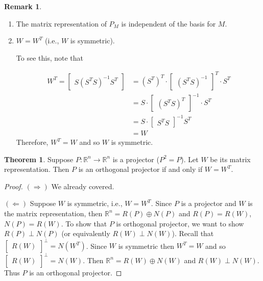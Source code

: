 \documentclass[12pt]{article}
\theoremstyle{definition}
\newtheorem{theorem}{Theorem}[section]  %
\newtheorem*{remark}{Remark}
\begin{document}
\begin{remark} $ $
\begin{enumerate}[label = (\arabic*)]
\item The matrix representation of $P_M$ is independent of the basis for $M$.
\item $W = W^T$ (i.e., $W$ is symmetric).

To see this, note that

\begin{align*}
W^T = \begin{bmatrix} S(S^T S)^{-1} S^T \end{bmatrix} &=
(S^T)^T \cdot \begin{bmatrix} (S^T S)^{-1} \end{bmatrix}^T \cdot S^T \\
&= S \cdot \begin{bmatrix} (S^T S)^T \end{bmatrix}^{-1} \cdot S^T \\
&= S \cdot \begin{bmatrix} S^T S \end{bmatrix}^{-1} S^T \\
&= W
\end{align*}
Therefore, $W^T = W$ and so $W$ is symmetric.
\end{enumerate}
\end{remark}


\begin{theorem} Suppose $P : \mathbb{R}^n \rightarrow \mathbb{R}^n$ is a projector
($P^2 = P$). Let $W$ be its matrix representation. Then $P$ is an orthogonal projector
if and only if $W = W^T$.
\end{theorem}

\begin{proof}
$(\Rightarrow)$ We already covered.

$(\Leftarrow)$ Suppose $W$ is symmetric, i.e., $W = W^T$. Since $P$ is a projector and $W$ 
is the matrix representation, then $\mathbb{R}^n = R(P) \oplus N(P)$ and $R(P) = R(W)$, 
$N(P) = R(W)$. To show that $P$ is orthogonal projector, we want to show $R(P) \perp N(P)$
(or equivalently $R(W) \perp N(W)$). Recall that $\begin{bmatrix} R(W) \end{bmatrix}^{\perp}
= N(W^T)$. Since $W$ is symmetric then $W^T = W$ and so 
$\begin{bmatrix} R(W) \end{bmatrix}^{\perp} = N(W)$. Then $\mathbb{R}^n = R(W) \oplus N(W)$
and $R(W) \perp N(W)$. Thus $P$ is an orthogonal projector.
\end{proof}
\end{document}
